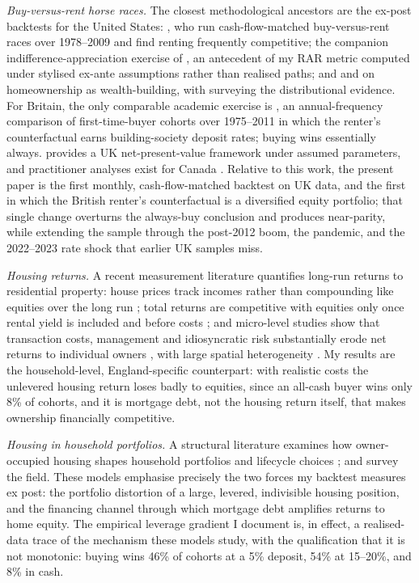 \emph{Buy-versus-rent horse races.} The closest methodological ancestors are the ex-post backtests for the United States: \textcite{beracha2012}, who run cash-flow-matched buy-versus-rent races over 1978--2009 and find renting frequently competitive; the companion indifference-appreciation exercise of \textcite{berachaseiler2012}, an antecedent of my RAR metric computed under stylised ex-ante assumptions rather than realised paths; and \textcite{rappaport2010} and \textcite{goodman2018} on homeownership as wealth-building, with \textcite{herbert2013} surveying the distributional evidence. For Britain, the only comparable academic exercise is \textcite{mostafa2019}, an annual-frequency comparison of first-time-buyer cohorts over 1975--2011 in which the renter's counterfactual earns building-society deposit rates; buying wins essentially always. \textcite{tabner2016} provides a UK net-present-value framework under assumed parameters, and practitioner analyses exist for Canada \parencite{felix2025}. Relative to this work, the present paper is the first monthly, cash-flow-matched backtest on UK data, and the first in which the British renter's counterfactual is a diversified equity portfolio; that single change overturns the always-buy conclusion and produces near-parity, while extending the sample through the post-2012 boom, the pandemic, and the 2022--2023 rate shock that earlier UK samples miss.

\emph{Housing returns.} A recent measurement literature quantifies long-run returns to residential property: house prices track incomes rather than compounding like equities over the long run \parencite{knoll2017}; total returns are competitive with equities only once rental yield is included and before costs \parencite{jorda2019rore}; and micro-level studies show that transaction costs, management and idiosyncratic risk substantially erode net returns to individual owners \parencite{chambers2021,eichholtz2021total,giacoletti2021,demers2022}, with large spatial heterogeneity \parencite{amaral2025}. My results are the household-level, England-specific counterpart: with realistic costs the unlevered housing return loses badly to equities, since an all-cash buyer wins only 8\% of cohorts, and it is mortgage debt, not the housing return itself, that makes ownership financially competitive.

\emph{Housing in household portfolios.} A structural literature examines how owner-occupied housing shapes household portfolios and lifecycle choices \parencite{flavin2002,cocco2005,yao2005,chetty2017,vestman2019}; \textcite{campbell2006} and \textcite{gomes2021} survey the field. These models emphasise precisely the two forces my backtest measures ex post: the portfolio distortion of a large, levered, indivisible housing position, and the financing channel through which mortgage debt amplifies returns to home equity. The empirical leverage gradient I document is, in effect, a realised-data trace of the mechanism these models study, with the qualification that it is not monotonic: buying wins 46\% of cohorts at a 5\% deposit, 54\% at 15--20\%, and 8\% in cash.

